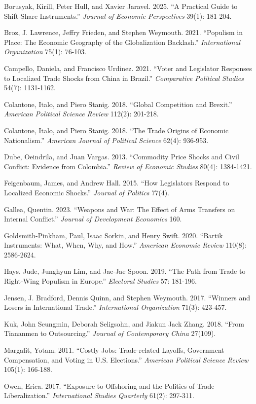 \documentclass[
]{article}
\begin{document}
Borusyak, Kirill, Peter Hull, and Xavier Jaravel. 2025. ``A Practical Guide to Shift-Share Instruments.'' \emph{Journal of Economic Perspectives} 39(1): 181-204.

Broz, J. Lawrence, Jeffry Frieden, and Stephen Weymouth. 2021. ``Populism in Place: The Economic Geography of the Globalization Backlash.'' \emph{International Organization} 75(1): 76-103.

Campello, Daniela, and Francisco Urdinez. 2021. ``Voter and Legislator Responses to Localized Trade Shocks from China in Brazil.'' \emph{Comparative Political Studies} 54(7): 1131-1162.

Colantone, Italo, and Piero Stanig. 2018. ``Global Competition and Brexit.'' \emph{American Political Science Review} 112(2): 201-218.

Colantone, Italo, and Piero Stanig. 2018. ``The Trade Origins of Economic Nationalism.'' \emph{American Journal of Political Science} 62(4): 936-953.

Dube, Oeindrila, and Juan Vargas. 2013. ``Commodity Price Shocks and Civil Conflict: Evidence from Colombia.'' \emph{Review of Economic Studies} 80(4): 1384-1421.

Feigenbaum, James, and Andrew Hall. 2015. ``How Legislators Respond to Localized Economic Shocks.'' \emph{Journal of Politics} 77(4).

Gallea, Quentin. 2023. ``Weapons and War: The Effect of Arms Transfers on Internal Conflict.'' \emph{Journal of Development Economics} 160.

Goldsmith-Pinkham, Paul, Isaac Sorkin, and Henry Swift. 2020. ``Bartik Instruments: What, When, Why, and How.'' \emph{American Economic Review} 110(8): 2586-2624.

Hays, Jude, Junghyun Lim, and Jae-Jae Spoon. 2019. ``The Path from Trade to Right-Wing Populism in Europe.'' \emph{Electoral Studies} 57: 181-196.

Jensen, J. Bradford, Dennis Quinn, and Stephen Weymouth. 2017. ``Winners and Losers in International Trade.'' \emph{International Organization} 71(3): 423-457.

Kuk, John Seungmin, Deborah Seligsohn, and Jiakun Jack Zhang. 2018. ``From Tiananmen to Outsourcing.'' \emph{Journal of Contemporary China} 27(109).

Margalit, Yotam. 2011. ``Costly Jobs: Trade-related Layoffs, Government Compensation, and Voting in U.S. Elections.'' \emph{American Political Science Review} 105(1): 166-188.

Owen, Erica. 2017. ``Exposure to Offshoring and the Politics of Trade Liberalization.'' \emph{International Studies Quarterly} 61(2): 297-311.
\end{document}
